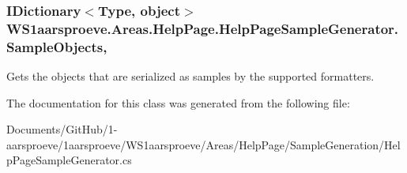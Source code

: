 \subsubsection[{Sample\+Objects}]{\setlength{\rightskip}{0pt plus 5cm}I\+Dictionary$<$Type, object$>$ W\+S1aarsproeve.\+Areas.\+Help\+Page.\+Help\+Page\+Sample\+Generator.\+Sample\+Objects\hspace{0.3cm}{\ttfamily [get]}, {\ttfamily [set]}}\label{class_w_s1aarsproeve_1_1_areas_1_1_help_page_1_1_help_page_sample_generator_a64ab17da769ced26a1908d1e48d5f9d0}


Gets the objects that are serialized as samples by the supported formatters. 



The documentation for this class was generated from the following file\+:\begin{DoxyCompactItemize}
\item 
Documents/\+Git\+Hub/1-\/aarsproeve/1aarsproeve/\+W\+S1aarsproeve/\+Areas/\+Help\+Page/\+Sample\+Generation/Help\+Page\+Sample\+Generator.\+cs\end{DoxyCompactItemize}
